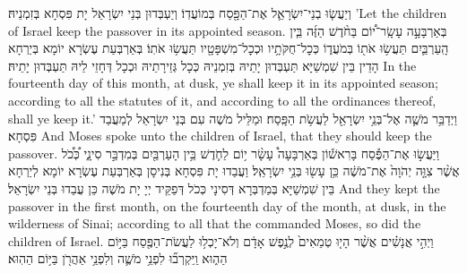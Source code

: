 {וְיַעֲשׂ֧וּ בְנֵי־יִשְׂרָאֵ֛ל אֶת־הַפָּ֖סַח בְּמוֹעֲדֽוֹ׃
}
{וְיַעְבְּדוּן בְּנֵי יִשְׂרָאֵל יָת פִּסְחָא בְּזִמְנֵיהּ׃}
{’Let the children of Israel keep the passover in its appointed season.}{}
{בְּאַרְבָּעָ֣ה עָשָֽׂר־י֠וֹם בַּחֹ֨דֶשׁ הַזֶּ֜ה בֵּ֧ין הָֽעַרְבַּ֛יִם תַּעֲשׂ֥וּ אֹת֖וֹ בְּמֹעֲד֑וֹ כְּכׇל־חֻקֹּתָ֥יו וּכְכׇל־מִשְׁפָּטָ֖יו תַּעֲשׂ֥וּ אֹתֽוֹ׃
}
{בְּאַרְבְּעַת עֶשְׂרָא יוֹמָא בְּיַרְחָא הָדֵין בֵּין שִׁמְשַׁיָּא תַּעְבְּדוּן יָתֵיהּ בְּזִמְנֵיהּ כְּכָל גְּזֵירָתֵיהּ וּכְכָל דְּחָזֵי לֵיהּ תַּעְבְּדוּן יָתֵיהּ׃}
{In the fourteenth day of this month, at dusk, ye shall keep it in its appointed season; according to all the statutes of it, and according to all the ordinances thereof, shall ye keep it.’}{}
{וַיְדַבֵּ֥ר מֹשֶׁ֛ה אֶל־בְּנֵ֥י יִשְׂרָאֵ֖ל לַעֲשֹׂ֥ת הַפָּֽסַח׃
}
{וּמַלֵּיל מֹשֶׁה עִם בְּנֵי יִשְׂרָאֵל לְמַעֲבַד פִּסְחָא׃}
{And Moses spoke unto the children of Israel, that they should keep the passover.}{}
{וַיַּעֲשׂ֣וּ אֶת־הַפֶּ֡סַח בָּרִאשׁ֡וֹן בְּאַרְבָּעָה֩ עָשָׂ֨ר י֥וֹם לַחֹ֛דֶשׁ בֵּ֥ין הָעַרְבַּ֖יִם בְּמִדְבַּ֣ר סִינָ֑י כְּ֠כֹ֠ל אֲשֶׁ֨ר צִוָּ֤ה יְהֹוָה֙ אֶת־מֹשֶׁ֔ה כֵּ֥ן עָשׂ֖וּ בְּנֵ֥י יִשְׂרָאֵֽל׃}
{וַעֲבַדוּ יָת פִּסְחָא בְּנִיסָן בְּאַרְבְּעַת עֶשְׂרָא יוֹמָא לְיַרְחָא בֵּין שִׁמְשַׁיָּא בְּמַדְבְּרָא דְּסִינָי כְּכֹל דְּפַקֵּיד יְיָ יָת מֹשֶׁה כֵּן עֲבַדוּ בְּנֵי יִשְׂרָאֵל׃}
{And they kept the passover in the first month, on the fourteenth day of the month, at dusk, in the wilderness of Sinai; according to all that the \lord\space commanded Moses, so did the children of Israel.}{}
{וַיְהִ֣י אֲנָשִׁ֗ים אֲשֶׁ֨ר הָי֤וּ טְמֵאִים֙ לְנֶ֣פֶשׁ אָדָ֔ם וְלֹא־יָכְל֥וּ לַעֲשֹׂת־הַפֶּ֖סַח בַּיּ֣וֹם הַה֑וּא וַֽיִּקְרְב֞וּ לִפְנֵ֥י מֹשֶׁ֛ה וְלִפְנֵ֥י אַהֲרֹ֖ן בַּיּ֥וֹם הַהֽוּא׃
}
